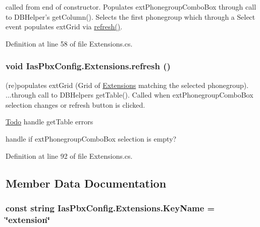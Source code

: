 called from end of constructor. Populates extPhonegroupComboBox through call to DBHelper's getColumn(). Selects the first phonegroup which through a Select event populates extGrid via \hyperlink{class_ias_pbx_config_1_1_extensions_a701d940ae6c6d38e9bc691af071d091b}{refresh()}. 

Definition at line 58 of file Extensions.cs.\hypertarget{class_ias_pbx_config_1_1_extensions_a701d940ae6c6d38e9bc691af071d091b}{
\subsubsection[{refresh}]{\setlength{\rightskip}{0pt plus 5cm}void IasPbxConfig.Extensions.refresh ()}}
\label{class_ias_pbx_config_1_1_extensions_a701d940ae6c6d38e9bc691af071d091b}


(re)populates extGrid (Grid of \hyperlink{class_ias_pbx_config_1_1_extensions}{Extensions} matching the selected phonegroup). ...through call to DBHelpers getTable(). Called when extPhonegroupComboBox selection changes or refresh button is clicked. \begin{Desc}
\item[\hyperlink{todo__todo000032}{Todo}]handle getTable errors 

handle if extPhonegroupComboBox selection is empty? \end{Desc}


Definition at line 92 of file Extensions.cs.

\subsection{Member Data Documentation}
\hypertarget{class_ias_pbx_config_1_1_extensions_a005c298b2abc38d8c33bda8a9dfafdc2}{
\subsubsection[{KeyName}]{\setlength{\rightskip}{0pt plus 5cm}const string {\bf IasPbxConfig.Extensions.KeyName} = \char`\"{}extension\char`\"{}}}
\label{class_ias_pbx_config_1_1_extensions_a005c298b2abc38d8c33bda8a9dfafdc2}


